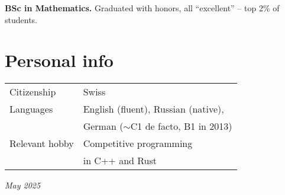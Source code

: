 \documentclass[a4paper, twocolumn, 10pt]{article}
\begin{document}
\textbf{BSc in Mathematics.} Graduated with honors, all ``excellent'' -- top 2\% of students.

\section*{Personal info}

\begin{tabular}{l l}
  \vspace{0.2cm}
  Citizenship & Swiss \\
  Languages & English (fluent), Russian (native), \\
  \vspace{0.2cm}
  & German ($\sim$C1 de facto, B1 in 2013) \\
  Relevant hobby & Competitive programming \\
  \vspace{0.2cm}
  & in C++ and Rust \\
\end{tabular}

\vspace*{\fill}
\hfill \emph{May 2025}
\end{document}
